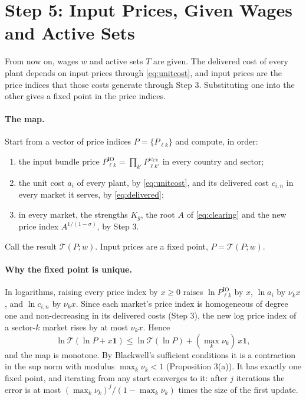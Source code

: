 \documentclass[11pt]{article}
\theoremstyle{remark}
\newcommand{\IO}{\mathrm{IO}}
\begin{document}
\section{Step 5: Input Prices, Given Wages and Active Sets}
\label{sec:prices}

From now on, wages $w$ and active sets $T$ are given. The delivered cost of every
plant depends on input prices through \eqref{eq:unitcost}, and input prices are the
price indices that those costs generate through Step 3. Substituting one into the
other gives a fixed point in the price indices.

\paragraph{The map.} Start from a vector of price indices $P=\{P_{\ell k}\}$ and
compute, in order:
\begin{enumerate}
\item the input bundle price $P^{\IO}_{\ell k}=\prod_{k'}P_{\ell k'}^{\omega_{k'k}}$ in
every country and sector;
\item the unit cost $a_i$ of every plant, by \eqref{eq:unitcost}, and its delivered
cost $c_{i,n}$ in every market it serves, by \eqref{eq:delivered};
\item in every market, the strengths $K_g$, the root $A$ of \eqref{eq:clearing} and the
new price index $A^{1/(1-\sigma)}$, by Step 3.
\end{enumerate}
Call the result $\mathcal T(P;w)$. Input prices are a fixed point,
$P=\mathcal T(P;w)$.

\paragraph{Why the fixed point is unique.} In logarithms, raising every price index by
$x\ge0$ raises $\ln P^{\IO}_{\ell k}$ by $x$, $\ln a_i$ by $\nu_kx$, and $\ln c_{i,n}$ by
$\nu_kx$. Since each market's price index is homogeneous of degree one and
non-decreasing in its delivered costs (Step 3), the new log price index of a
sector-$k$ market rises by at most $\nu_kx$. Hence
\[
  \ln\mathcal T(\ln P+x\mathbf 1)\le\ln\mathcal T(\ln P)+(\max_k\nu_k)\,x\mathbf 1,
\]
and the map is monotone. By Blackwell's sufficient conditions it is a contraction in
the sup norm with modulus $\max_k\nu_k<1$ (Proposition 3(a)). It has exactly one fixed
point, and iterating from any start converges to it: after $j$ iterations the error is
at most $(\max_k\nu_k)^j/(1-\max_k\nu_k)$ times the size of the first update.
\end{document}
